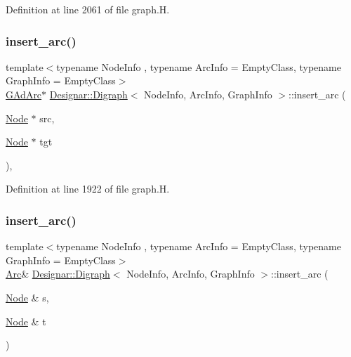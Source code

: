 Definition at line 2061 of file graph.\+H.

\mbox{\label{class_designar_1_1_digraph_a9180c479d24dc8dc648a37451c90d066}} 
\subsubsection{\texorpdfstring{insert\+\_\+arc()}{insert\_arc()}\hspace{0.1cm}{\footnotesize\ttfamily [1/4]}}
{\footnotesize\ttfamily template$<$typename Node\+Info , typename Arc\+Info  = Empty\+Class, typename Graph\+Info  = Empty\+Class$>$ \\
\hyperlink{class_designar_1_1_digraph_a0c6d846f23d1e82556fb6055557df53f}{G\+Ad\+Arc}$\ast$ \hyperlink{class_designar_1_1_digraph}{Designar\+::\+Digraph}$<$ Node\+Info, Arc\+Info, Graph\+Info $>$\+::insert\+\_\+arc (\begin{DoxyParamCaption}\item[{\hyperlink{class_designar_1_1_digraph_a4dc921c41a480b7946a04170e997d8ae}{Node} $\ast$}]{src,  }\item[{\hyperlink{class_designar_1_1_digraph_a4dc921c41a480b7946a04170e997d8ae}{Node} $\ast$}]{tgt }\end{DoxyParamCaption})\hspace{0.3cm}{\ttfamily [inline]}, {\ttfamily [protected]}}



Definition at line 1922 of file graph.\+H.

\mbox{\label{class_designar_1_1_digraph_a52b127c0102e207125c6f4eaaeb7ab26}} 
\subsubsection{\texorpdfstring{insert\+\_\+arc()}{insert\_arc()}\hspace{0.1cm}{\footnotesize\ttfamily [2/4]}}
{\footnotesize\ttfamily template$<$typename Node\+Info , typename Arc\+Info  = Empty\+Class, typename Graph\+Info  = Empty\+Class$>$ \\
\hyperlink{class_designar_1_1_digraph_a0ceb278671f2a535c00fddccdeafd69f}{Arc}\& \hyperlink{class_designar_1_1_digraph}{Designar\+::\+Digraph}$<$ Node\+Info, Arc\+Info, Graph\+Info $>$\+::insert\+\_\+arc (\begin{DoxyParamCaption}\item[{\hyperlink{class_designar_1_1_digraph_a4dc921c41a480b7946a04170e997d8ae}{Node} \&}]{s,  }\item[{\hyperlink{class_designar_1_1_digraph_a4dc921c41a480b7946a04170e997d8ae}{Node} \&}]{t }\end{DoxyParamCaption})\hspace{0.3cm}{\ttfamily [inline]}}



